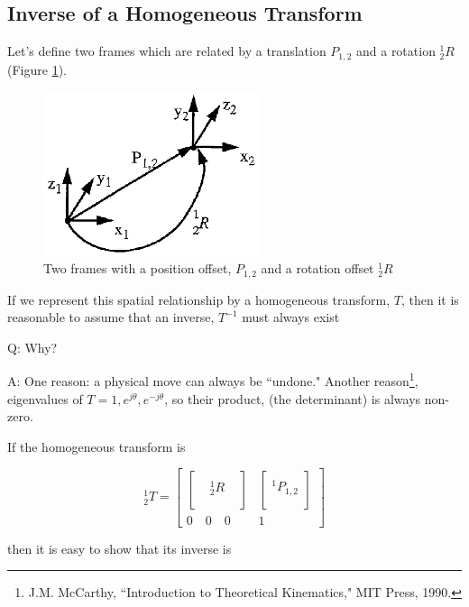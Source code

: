 \subsection{Inverse of a Homogeneous Transform}
Let's define two frames which are related by a translation $P_{1,2}$ and a rotation $^1_2R$ (Figure \ref{positionrotationoffset}).

\begin{figure}\centering
\includegraphics[width=2.5in]{figs04/00432.eps}
\caption{Two frames with a position offset, $P_{1,2}$ and a rotation offset ${^1_2R}$}\label{positionrotationoffset}
\end{figure}

If we represent this spatial relationship by a homogeneous transform, $T$, then it is reasonable to assume that an inverse, $T^{-1}$ must always exist

Q:  Why?

A:  One reason: a physical move can always be ``undone."   Another reason\footnote{J.M. McCarthy, ``Introduction to Theoretical Kinematics," MIT Press, 1990.},
eigenvalues of $T = 1, e^{j\theta}, e^{-j\theta}$, so their product, (the determinant) is always non-zero.

If the homogeneous transform is

\[
^1_2T =
\begin{bmatrix}
\begin{bmatrix}  &  &  \\  & ^1_2R&  \\ & & \\ \end{bmatrix}      &
 \begin{bmatrix}  \\ ^1P_{1,2} \\  \\ \end{bmatrix}            \\
 0 \quad 0 \quad 0      &   1
\end{bmatrix}
\]

then it is easy to show that its inverse is

